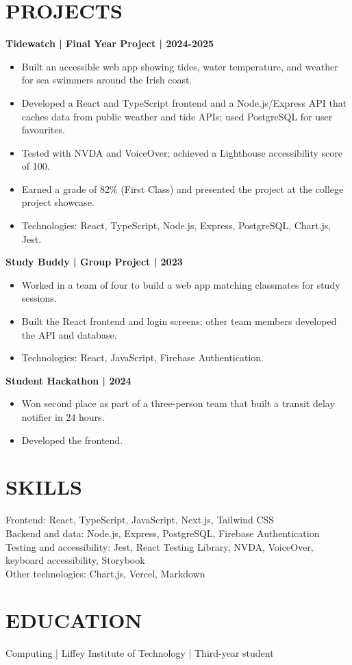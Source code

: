 \documentclass[11pt,a4paper]{article}
\begin{document}
\section*{PROJECTS}
\textbf{Tidewatch | Final Year Project | 2024-2025}
\begin{itemize}
\item Built an accessible web app showing tides, water temperature, and weather for sea swimmers around the Irish coast.
\item Developed a React and TypeScript frontend and a Node.js/Express API that caches data from public weather and tide APIs; used PostgreSQL for user favourites.
\item Tested with NVDA and VoiceOver; achieved a Lighthouse accessibility score of 100.
\item Earned a grade of 82\% (First Class) and presented the project at the college project showcase.
\item Technologies: React, TypeScript, Node.js, Express, PostgreSQL, Chart.js, Jest.
\end{itemize}

\textbf{Study Buddy | Group Project | 2023}
\begin{itemize}
\item Worked in a team of four to build a web app matching classmates for study sessions.
\item Built the React frontend and login screens; other team members developed the API and database.
\item Technologies: React, JavaScript, Firebase Authentication.
\end{itemize}

\textbf{Student Hackathon | 2024}
\begin{itemize}
\item Won second place as part of a three-person team that built a transit delay notifier in 24 hours.
\item Developed the frontend.
\end{itemize}

\section*{SKILLS}
Frontend: React, TypeScript, JavaScript, Next.js, Tailwind CSS\\
Backend and data: Node.js, Express, PostgreSQL, Firebase Authentication\\
Testing and accessibility: Jest, React Testing Library, NVDA, VoiceOver, keyboard accessibility, Storybook\\
Other technologies: Chart.js, Vercel, Markdown

\section*{EDUCATION}
Computing | Liffey Institute of Technology | Third-year student
\end{document}

